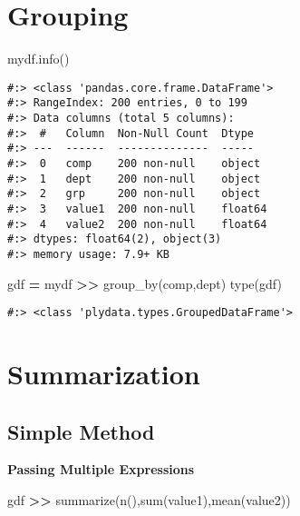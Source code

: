 \documentclass[
]{book}
\newenvironment{Shaded}{\begin{snugshade}}{\end{snugshade}}
\newcommand{\BuiltInTok}[1]{#1}
\newcommand{\NormalTok}[1]{#1}
\newcommand{\OperatorTok}[1]{\textcolor[rgb]{0.43,0.43,0.43}{\textbf{#1}}}
\newcommand{\StringTok}[1]{\textcolor[rgb]{0.5,0.5,0.5}{#1}}
\begin{document}
\hypertarget{grouping}{%
\section{Grouping}\label{grouping}}

\begin{Shaded}
\begin{Highlighting}[]
\NormalTok{mydf.info()}
\end{Highlighting}
\end{Shaded}

\begin{verbatim}
#:> <class 'pandas.core.frame.DataFrame'>
#:> RangeIndex: 200 entries, 0 to 199
#:> Data columns (total 5 columns):
#:>  #   Column  Non-Null Count  Dtype  
#:> ---  ------  --------------  -----  
#:>  0   comp    200 non-null    object 
#:>  1   dept    200 non-null    object 
#:>  2   grp     200 non-null    object 
#:>  3   value1  200 non-null    float64
#:>  4   value2  200 non-null    float64
#:> dtypes: float64(2), object(3)
#:> memory usage: 7.9+ KB
\end{verbatim}

\begin{Shaded}
\begin{Highlighting}[]
\NormalTok{gdf }\OperatorTok{=}\NormalTok{ mydf }\OperatorTok{\textgreater{}\textgreater{}}\NormalTok{ group\_by(}\StringTok{\textquotesingle{}comp\textquotesingle{}}\NormalTok{,}\StringTok{\textquotesingle{}dept\textquotesingle{}}\NormalTok{)}
\BuiltInTok{type}\NormalTok{(gdf)}
\end{Highlighting}
\end{Shaded}

\begin{verbatim}
#:> <class 'plydata.types.GroupedDataFrame'>
\end{verbatim}

\hypertarget{summarization}{%
\section{Summarization}\label{summarization}}

\hypertarget{simple-method}{%
\subsection{Simple Method}\label{simple-method}}

\textbf{Passing Multiple Expressions}

\begin{Shaded}
\begin{Highlighting}[]
\NormalTok{gdf }\OperatorTok{\textgreater{}\textgreater{}}\NormalTok{ summarize(}\StringTok{\textquotesingle{}n()\textquotesingle{}}\NormalTok{,}\StringTok{\textquotesingle{}sum(value1)\textquotesingle{}}\NormalTok{,}\StringTok{\textquotesingle{}mean(value2)\textquotesingle{}}\NormalTok{)}
\end{Highlighting}
\end{Shaded}
\end{document}
